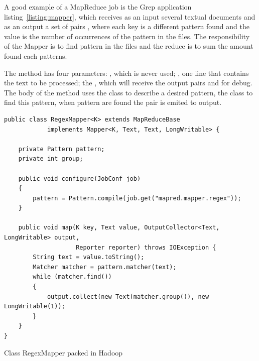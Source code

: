 A good example of a MapReduce job is the Grep application listing~\ref{listing:mapper},
which receives as an input several textual documents and as an output a set of pairs
, where each key is a different pattern found and the value is the
number of occurrences of the pattern in the files. The responsibility of the Mapper
is to find pattern in the files and the reduce is to sum the amount found each patterns.

The  method has four parameters: , which is never used; ,
one line that contains the text to be processed; the , which will receive
the output pairs and  for debug. The body of the method uses the class
 to describe a desired pattern, the class  to find this
pattern, when pattern are found the pair  is emited to
output.

\singlespacing
\begin{listing}[H]
\begin{verbatim}
public class RegexMapper<K> extends MapReduceBase
			implements Mapper<K, Text, Text, LongWritable> {

    private Pattern pattern;
    private int group;

    public void configure(JobConf job)
    {
        pattern = Pattern.compile(job.get("mapred.mapper.regex"));
    }

    public void map(K key, Text value, OutputCollector<Text, LongWritable> output,
					Reporter reporter) throws IOException {
        String text = value.toString();
        Matcher matcher = pattern.matcher(text);
        while (matcher.find())
        {
            output.collect(new Text(matcher.group()), new LongWritable(1));
        }
    }
}
\end{verbatim}
\caption{Class RegexMapper packed in Hadoop~\cite{hadoop}} 
\label{listing:mapper}
\end{listing}


